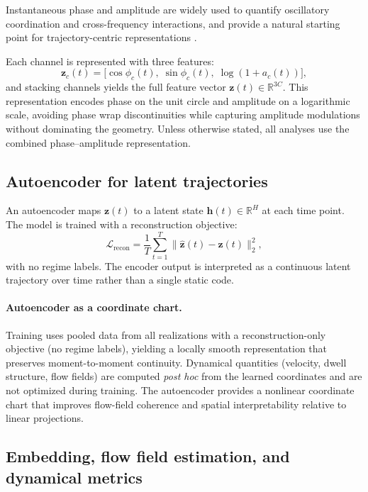 \documentclass[5p,twocolumn,authoryear]{elsarticle}
\begin{document}
Instantaneous phase and amplitude are widely used to quantify oscillatory coordination and cross-frequency interactions, and provide a natural starting point for trajectory-centric representations \citep{Canolty2006,Tort2010}.

Each channel is represented with three features:
\begin{equation}
\mathbf{z}_c(t) = \big[\cos\phi_c(t),\; \sin\phi_c(t),\; \log(1 + a_c(t))\big],
\end{equation}
and stacking channels yields the full feature vector $\mathbf{z}(t) \in \mathbb{R}^{3C}$. This representation encodes phase on the unit circle and amplitude on a logarithmic scale, avoiding phase wrap discontinuities while capturing amplitude modulations without dominating the geometry. Unless otherwise stated, all analyses use the combined phase--amplitude representation.

\subsection{Autoencoder for latent trajectories}

An autoencoder maps $\mathbf{z}(t)$ to a latent state $\mathbf{h}(t) \in \mathbb{R}^{H}$ at each time point. The model is trained with a reconstruction objective:
\begin{equation}
\mathcal{L}_{\mathrm{recon}} = \frac{1}{T}\sum_{t=1}^{T}\|\hat{\mathbf{z}}(t) - \mathbf{z}(t)\|_2^2,
\end{equation}
with no regime labels. The encoder output is interpreted as a continuous latent trajectory over time rather than a single static code.

\paragraph{Autoencoder as a coordinate chart.}
Training uses pooled data from all realizations with a reconstruction-only objective (no regime labels), yielding a locally smooth representation that preserves moment-to-moment continuity. Dynamical quantities (velocity, dwell structure, flow fields) are computed \emph{post hoc} from the learned coordinates and are not optimized during training. The autoencoder provides a nonlinear coordinate chart that improves flow-field coherence and spatial interpretability relative to linear projections.

\subsection{Embedding, flow field estimation, and dynamical metrics}
\end{document}
